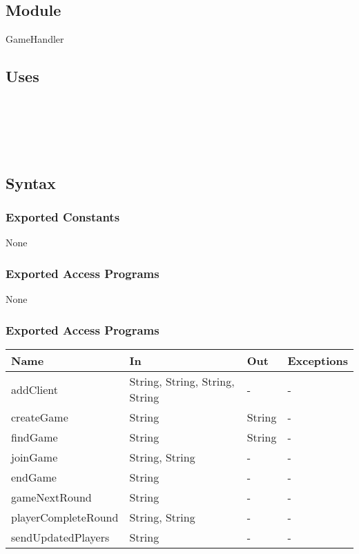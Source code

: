 \documentclass[12pt, titlepage]{article}
\begin{document}
\subsection{Module}

GameHandler

\subsection{Uses}

 \\
\\
\\
\\

\subsection{Syntax}


\subsubsection{Exported Constants}
None

\subsubsection{Exported Access Programs}
None

\subsubsection{Exported Access Programs}

\begin{center}
\begin{tabular}{| p{5cm} | p{4cm} | p{4cm} | p{2.25cm} |}
\hline
\textbf{Name} & \textbf{In} & \textbf{Out} & \textbf{Exceptions} \\
\hline
addClient & String, String, String, String & - & - \\
\hline
createGame & String & String & - \\
\hline
findGame & String & String & - \\
\hline
joinGame & String, String & - & - \\
\hline
endGame & String & - & - \\
\hline
gameNextRound & String & - & - \\
\hline
playerCompleteRound & String, String & - & - \\
\hline
sendUpdatedPlayers &  String & - & - \\
\hline


\end{tabular}
\end{center}
\end{document}

